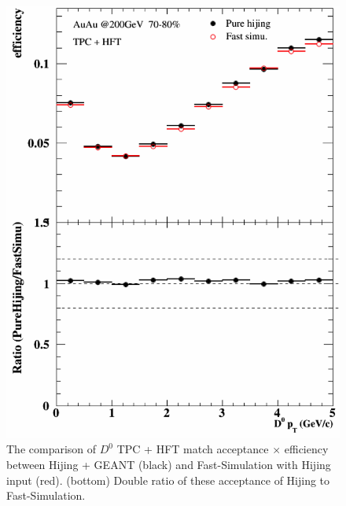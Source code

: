 \begin{figure}[htbp]
\begin{minipage}[htbp]{0.47\linewidth}
\centering
\includegraphics[width=1.0\textwidth,angle=0]{figure/Run14_D0HFT/70_80_2.png}
\caption{ The comparison of $D^0$ TPC + HFT match acceptance $\times$ efficiency between Hijing + GEANT (black) and Fast-Simulation with Hijing input (red). (bottom) Double ratio of these acceptance of Hijing to Fast-Simulation.\label{70_80_2}}
\end{minipage}
\hfill
\begin{minipage}[htbp]{0.47\linewidth}
\centering

\end{minipage}
\end{figure}
